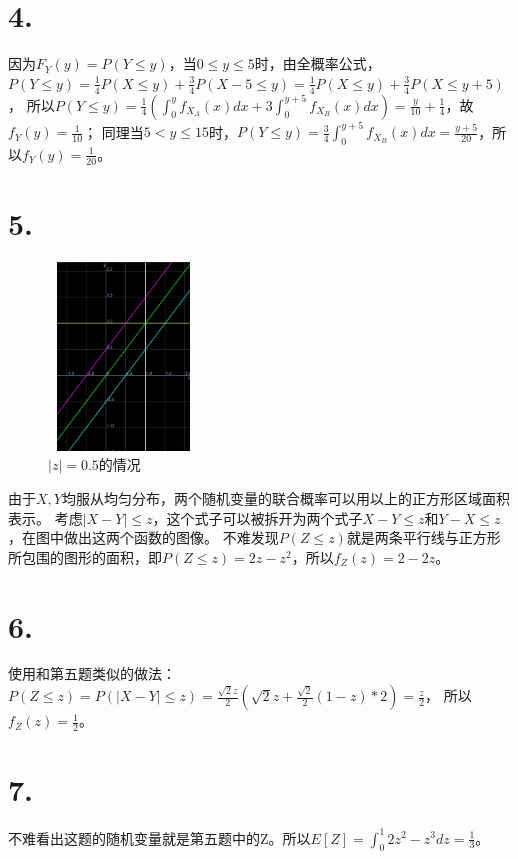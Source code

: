 \documentclass[UTF8]{report}
\begin{document}
    \section*{4.}
        因为$F_Y(y) = P(Y \leq y)$，当$0 \leq y \leq 5$时，由全概率公式，
        $P(Y \leq y) = \frac{1}{4}P(X \leq y) + \frac{3}{4}P(X - 5 \leq y) = \frac{1}{4}P(X \leq y) + \frac{3}{4}P(X \leq y + 5)$，
        所以$P(Y \leq y) = \frac{1}{4}(\int_{0}^{y}f_{X_A}(x)dx + 3\int_{0}^{y + 5}f_{X_B}(x)dx) = \frac{y}{10} + \frac{1}{4}$，故$f_Y(y) = \frac{1}{10}$；
        同理当$5 < y \leq 15$时，$P(Y \leq y) = \frac{3}{4}\int_{0}^{y + 5}f_{X_B}(x)dx = \frac{y + 5}{20}$，所以$f_Y(y) = \frac{1}{20}$。
    \section*{5.}
        \begin{figure}[h]
            \centering
            \includegraphics[width=4cm, height=5cm]{img4-1-5.jpg}
            \caption{$|z| = 0.5$的情况}
        \end{figure}

        由于$X, Y$均服从均匀分布，两个随机变量的联合概率可以用以上的正方形区域面积表示。
        考虑$|X - Y| \leq z$，这个式子可以被拆开为两个式子$X - Y \leq z$和$Y - X \leq z$，在图中做出这两个函数的图像。
        不难发现$P(Z \leq z)$就是两条平行线与正方形所包围的图形的面积，即$P(Z \leq z) = 2z - z^2$，所以$f_Z(z) = 2 - 2z$。
    \section*{6.}
        使用和第五题类似的做法：$P(Z \leq z) = P(|X - Y| \leq z) = \frac{\sqrt{2}z}{2}(\sqrt{2}z + \frac{\sqrt{2}}{2}(1 - z) * 2) = \frac{z}{2}$，
        所以$f_Z(z) = \frac{1}{2}$。
    \section*{7.}
        不难看出这题的随机变量就是第五题中的Z。所以$E[Z] = \int_{0}^{1}2z^2 - z^3dz = \frac{1}{3}$。
\end{document}
